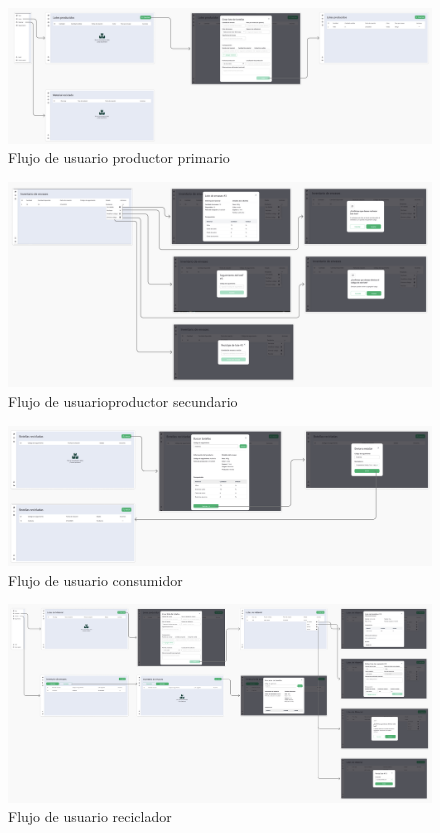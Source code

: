 \begin{figure}[!htb]
	\centering
	\includegraphics[width=\linewidth]{Figures/flow-primary-producer.png}
	\caption{Flujo de usuario productor primario}
  \label{fig:flow-primary-producer}
\end{figure}

\begin{figure}[!htb]
	\centering
	\includegraphics[width=\linewidth]{Figures/flow-secondary-producer.png}
	\caption{Flujo de usuarioproductor secundario}
  \label{fig:flow-secondary-producer}
\end{figure}

\begin{figure}[!htb]
	\centering
	\includegraphics[width=\linewidth]{Figures/flow-consumer.png}
	\caption{Flujo de usuario consumidor}
  \label{fig:flow-consumer}
\end{figure}

\begin{figure}[!htb]
	\centering
	\includegraphics[width=\linewidth]{Figures/flow-recycler.png}
	\caption{Flujo de usuario reciclador}
  \label{fig:flow-recycler}
\end{figure}

